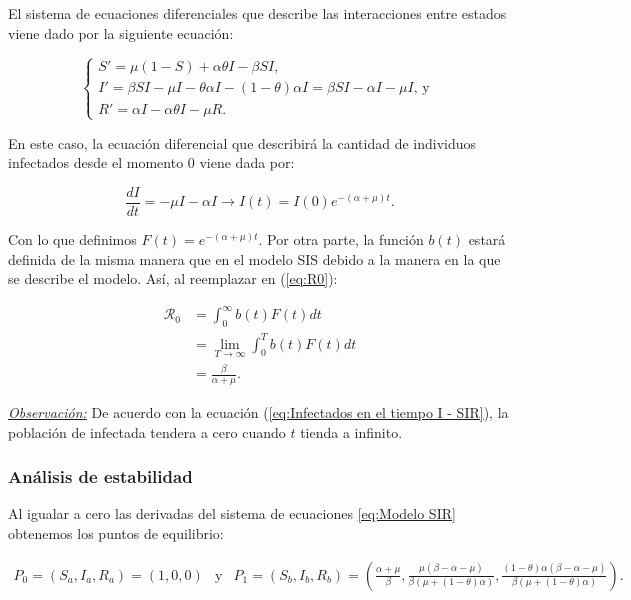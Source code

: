 El sistema de ecuaciones diferenciales que describe las interacciones entre estados viene dado por la siguiente ecuación:

\begin{equation}\label{eq:Modelo SIR}
\left\{
\begin{array}{l}
S' = \mu(1 - S) + \alpha\theta I - \beta S I, \\
I' = \beta S I - \mu I - \theta\alpha I - (1 - \theta)\alpha I = \beta S I - \alpha I - \mu I\text{, y } \\
R' = \alpha I - \alpha\theta I - \mu R.
\end{array}
\right.
\end{equation}

En este caso, la ecuación diferencial que describirá la cantidad de individuos infectados desde el momento 0 viene dada por:

\begin{equation}\label{eq:Infectados en el tiempo I - SIR}
    \frac{dI}{dt}=-\mu I - \alpha I \longrightarrow I(t)=I(0)e^{-(\alpha+\mu)t}.
\end{equation}

Con lo que definimos $F(t)=e^{-(\alpha+\mu)t}$. Por otra parte, la función $b(t)$ estará definida de la misma manera que en el modelo SIS debido a la manera en la que se describe el modelo. Así, al reemplazar en (\ref{eq:R0}):

\begin{align*}
\mathcal{R}_0 &= \int_0^\infty b(t)F(t) dt \\
&= \lim_{T\to\infty} \int_0^T b(t)F(t) dt \\
&= \frac{\beta}{\alpha+\mu}.
\end{align*}

\underline{\textit{Observación:}} De acuerdo con la ecuación (\ref{eq:Infectados en el tiempo I - SIR}), la población de infectada tendera a cero cuando $t$ tienda a infinito.

\subsubsection{Análisis de estabilidad}

Al igualar a cero las derivadas del sistema de ecuaciones \ref{eq:Modelo SIR} obtenemos los puntos de equilibrio:

$$\begin{array}{ccc}
P_0=(S_a,I_a,R_a)=(1,0,0) & \text{y} & P_1=(S_b,I_b,R_b)=\left(\frac{\alpha+\mu}{\beta},\frac{\mu(\beta-\alpha-\mu)}{\beta(\mu+(1-\theta)\alpha)},\frac{(1-\theta)\alpha(\beta-\alpha-\mu)}{\beta(\mu+(1-\theta)\alpha)}\right).
\end{array}$$

